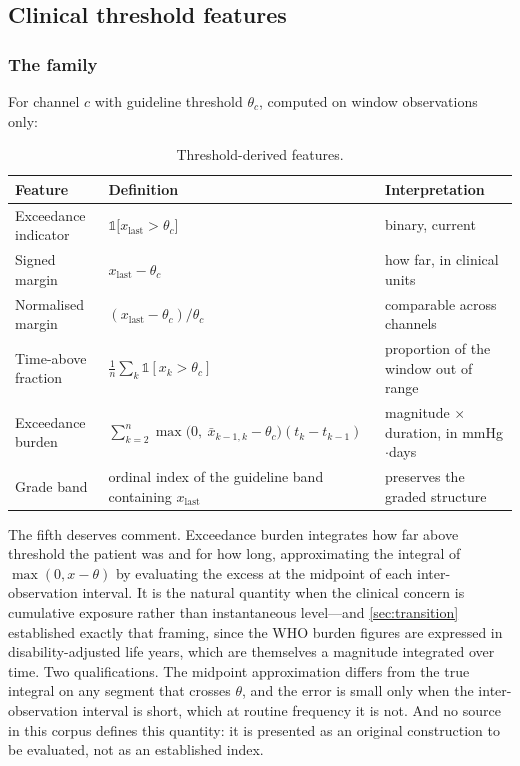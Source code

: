 \documentclass[12pt,a4paper,oneside]{report}
\begin{document}
\subsection{Clinical threshold features}\label{sec:threshold-features}

\subsubsection{The family}

For channel $c$ with guideline threshold $\theta_c$, computed on window observations only:

\begin{table}[htbp]
\centering\footnotesize
\caption{Threshold-derived features.}\label{tab:threshold-features}
\begin{tabularx}{\textwidth}{@{}>{\raggedright\arraybackslash}p{3.0cm} >{\raggedright\arraybackslash}p{5.0cm} X@{}}
\toprule
\textbf{Feature} & \textbf{Definition} & \textbf{Interpretation} \\
\midrule
Exceedance indicator & $\mathbb{1}\bigl[x_{\text{last}} > \theta_c\bigr]$ & binary, current \\
Signed margin & $x_{\text{last}} - \theta_c$ & how far, in clinical units \\
Normalised margin & $(x_{\text{last}} - \theta_c)/\theta_c$ & comparable across channels \\
Time-above fraction & $\frac{1}{n}\sum_k \mathbb{1}[x_k > \theta_c]$ & proportion of the window out of range \\
Exceedance burden & $\sum_{k=2}^{n} \max\bigl(0,\ \bar{x}_{k-1,k} - \theta_c\bigr)(t_k - t_{k-1})$ & magnitude $\times$ duration, in mmHg$\cdot$days \\
Grade band & ordinal index of the guideline band containing $x_{\text{last}}$ & preserves the graded structure \\
\bottomrule
\end{tabularx}
\end{table}

The fifth deserves comment. Exceedance burden integrates how far above threshold the patient was and for how long, approximating the integral of $\max(0, x-\theta)$ by evaluating the excess at the midpoint of each inter-observation interval. It is the natural quantity when the clinical concern is cumulative exposure rather than instantaneous level---and \cref{sec:transition} established exactly that framing, since the WHO burden figures are expressed in disability-adjusted life years, which are themselves a magnitude integrated over time. Two qualifications. The midpoint approximation differs from the true integral on any segment that crosses $\theta$, and the error is small only when the inter-observation interval is short, which at routine frequency it is not. And no source in this corpus defines this quantity: it is presented as an original construction to be evaluated, not as an established index.
\end{document}
